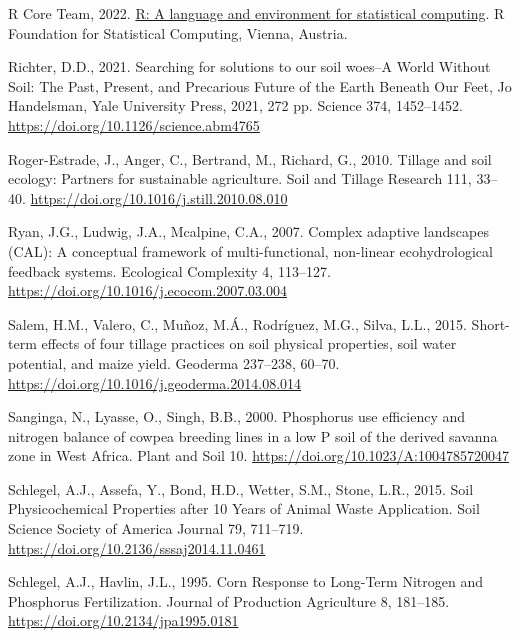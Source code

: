 \documentclass[
  12pt,
]{article}
\newlength{\cslhangindent}
\newlength{\cslentryspacingunit} %
\newenvironment{CSLReferences}[2] %
 {%
  \setlength{\parindent}{0pt}
  \ifodd #1
  \let\oldpar\par
  \def\par{\hangindent=\cslhangindent\oldpar}
  \fi
  \setlength{\parskip}{#2\cslentryspacingunit}
 }%
 {}
\begin{document}
\begin{CSLReferences}{1}{0}
\leavevmode{}%
R Core Team, 2022. \href{https://www.R-project.org/}{R: A language and environment for statistical computing}. R Foundation for Statistical Computing, Vienna, Austria.

\leavevmode{}%
Richter, D.D., 2021. Searching for solutions to our soil woes--{A World Without Soil}: {The Past}, {Present}, and {Precarious Future} of the {Earth Beneath Our Feet}, {Jo Handelsman}, {Yale University Press}, 2021, 272 pp. Science 374, 1452--1452. \url{https://doi.org/10.1126/science.abm4765}

\leavevmode{}%
Roger-Estrade, J., Anger, C., Bertrand, M., Richard, G., 2010. Tillage and soil ecology: {Partners} for sustainable agriculture. Soil and Tillage Research 111, 33--40. \url{https://doi.org/10.1016/j.still.2010.08.010}

\leavevmode{}%
Ryan, J.G., Ludwig, J.A., Mcalpine, C.A., 2007. Complex adaptive landscapes ({CAL}): {A} conceptual framework of multi-functional, non-linear ecohydrological feedback systems. Ecological Complexity 4, 113--127. \url{https://doi.org/10.1016/j.ecocom.2007.03.004}

\leavevmode{}%
Salem, H.M., Valero, C., Muñoz, M.Á., Rodríguez, M.G., Silva, L.L., 2015. Short-term effects of four tillage practices on soil physical properties, soil water potential, and maize yield. Geoderma 237--238, 60--70. \url{https://doi.org/10.1016/j.geoderma.2014.08.014}

\leavevmode{}%
Sanginga, N., Lyasse, O., Singh, B.B., 2000. Phosphorus use efficiency and nitrogen balance of cowpea breeding lines in a low {P} soil of the derived savanna zone in {West Africa}. Plant and Soil 10. \url{https://doi.org/10.1023/A:1004785720047}

\leavevmode{}%
Schlegel, A.J., Assefa, Y., Bond, H.D., Wetter, S.M., Stone, L.R., 2015. Soil {Physicochemical Properties} after 10 {Years} of {Animal Waste Application}. Soil Science Society of America Journal 79, 711--719. \url{https://doi.org/10.2136/sssaj2014.11.0461}

\leavevmode{}%
Schlegel, A.J., Havlin, J.L., 1995. Corn {Response} to {Long-Term Nitrogen} and {Phosphorus Fertilization}. Journal of Production Agriculture 8, 181--185. \url{https://doi.org/10.2134/jpa1995.0181}


\end{CSLReferences}
\end{document}
